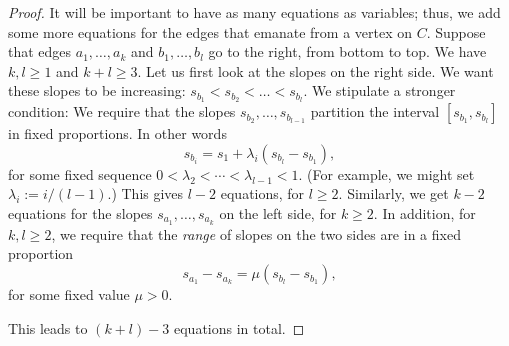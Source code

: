 \begin{proof}
It will be important to have as many equations as variables;
thus, we add some more equations for the edges that emanate from a
vertex on $C$.
Suppose that edges $a_1,\ldots,a_k$ and $b_1,\ldots,b_l$ go to the
right, from bottom to top.
We have $k,l\ge1$ and $k+l\ge 3$.
Let us first look at the slopes on the right side.
We want these slopes to be increasing:
$s_{b_1} < s_{b_2} < \dots  <s_{b_l}$. We stipulate a stronger
condition:
We require that the slopes
$s_{b_2}, \dots, s_{b_{l-1}}$ partition the interval
$[s_{b_1},s_{b_l}]$ in fixed proportions. In other words
\begin{equation}
  \label{eq:proportion}
s_{b_i} = s_1 + \lambda_i(s_{b_{l}}-s_{b_1}),
\end{equation}
for some fixed sequence $0<\lambda_2<\cdots<\lambda_{l-1}<1$.
(For example, we might set $\lambda_i := i/(l-1)$.)
This gives $l-2$ equations, for $l\ge 2$. Similarly, we get
$k-2$ equations for the slopes
$s_{a_1}, \dots, s_{a_{k}}$ on the left side, for $k\ge 2$.
In addition, for $k,l\ge 2$, we require that the \emph{range} of
slopes
on the two sides are in a fixed proportion
\begin{equation}
  \label{eq:proportion2}
s_{a_1}-s_{a_{k}} = \mu (s_{b_{l}}-s_{b_1}),
\end{equation}
for some fixed value $\mu>0$.

This leads to $(k+l)-3$ equations in total.





\end{proof}
